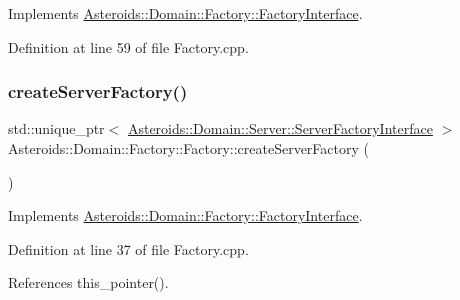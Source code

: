 Implements \hyperlink{classAsteroids_1_1Domain_1_1Factory_1_1FactoryInterface_ab638c74cc5a7cd464064b686b79f8056}{Asteroids\+::\+Domain\+::\+Factory\+::\+Factory\+Interface}.



Definition at line 59 of file Factory.\+cpp.

\mbox{\label{classAsteroids_1_1Domain_1_1Factory_1_1Factory_a7d3fd1dd5d6f0e44de2b4a57985b623b}} 
\subsubsection{\texorpdfstring{create\+Server\+Factory()}{createServerFactory()}}
{\footnotesize\ttfamily std\+::unique\+\_\+ptr$<$ \hyperlink{classAsteroids_1_1Domain_1_1Server_1_1ServerFactoryInterface}{Asteroids\+::\+Domain\+::\+Server\+::\+Server\+Factory\+Interface} $>$ Asteroids\+::\+Domain\+::\+Factory\+::\+Factory\+::create\+Server\+Factory (\begin{DoxyParamCaption}{ }\end{DoxyParamCaption})\hspace{0.3cm}{\ttfamily [virtual]}}



Implements \hyperlink{classAsteroids_1_1Domain_1_1Factory_1_1FactoryInterface_a3425d5d2760883c62951a46268e6ddac}{Asteroids\+::\+Domain\+::\+Factory\+::\+Factory\+Interface}.



Definition at line 37 of file Factory.\+cpp.



References this\+\_\+pointer().

